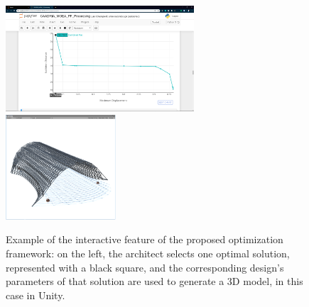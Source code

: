 \begin{figure}[htbp]
	\centering
	\includegraphics[width=0.625\textwidth]{./Images/Solution/fake-plot-browserview-square.PNG}
	\hfill
	\includegraphics[width=0.365\textwidth]{./Images/Solution/solution3-unity.png}
	
	\caption[Interactive Visualization of Optimization results]{Example of the interactive feature of the proposed optimization framework: on the left, the architect selects one optimal solution, represented with a black square, and the corresponding design's parameters of that solution are used to generate a 3D model, in this case in Unity.}
	\label{fig:interactivefeature}
\end{figure}
